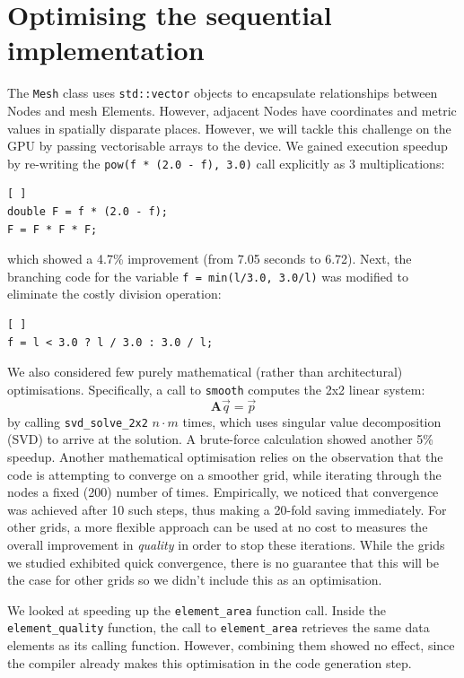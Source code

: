 \documentclass[a4paper,11pt, twocolumn]{article}
\begin{document}
\section{Optimising the sequential implementation}
The \verb+Mesh+ class uses \verb+std::vector+ objects to encapsulate relationships between Nodes and mesh Elements.
However, adjacent Nodes have coordinates and metric values in spatially disparate places.
However, we will tackle this challenge on the GPU by passing vectorisable arrays to the device.
We gained execution speedup by re-writing the \verb+pow(f * (2.0 - f), 3.0)+ call explicitly as 3 multiplications:
\begin{lstlisting}[ ]
double F = f * (2.0 - f);
F = F * F * F;
\end{lstlisting}
which showed a 4.7\% improvement (from 7.05 seconds to 6.72).
Next, the branching code for the variable \verb+f = min(l/3.0, 3.0/l)+ was modified to eliminate the costly division operation:
\begin{lstlisting}[ ]
f = l < 3.0 ? l / 3.0 : 3.0 / l;
\end{lstlisting}
We also considered few purely mathematical (rather than architectural) optimisations.
Specifically, a call to \verb+smooth+ computes the 2x2 linear system:
\[
\mathbf{A}\vec{q} = \vec{p}
\]
by calling \verb+svd_solve_2x2+ $n \cdot m$ times, which uses singular value decomposition (SVD) to arrive at the solution.
A brute-force calculation showed another 5\% speedup.
Another mathematical optimisation relies on the observation that the code is attempting to converge on a smoother grid, while iterating through the nodes a fixed (200) number of times.
Empirically, we noticed that convergence was achieved after 10 such steps, thus making a 20-fold saving immediately.
For other grids, a more flexible approach can be used at no cost to measures the overall improvement in \emph{quality} in order to stop these iterations.
While the grids we studied exhibited quick convergence, there is no guarantee that this will be the case for other grids so we didn't include this as an optimisation.

We looked at speeding up the \verb+element_area+ function call.
Inside the \verb+element_quality+ function, the call to \verb+element_area+ retrieves the same data elements as its calling function.
However, combining them showed no effect, since the compiler already makes this optimisation in the code generation step.
\end{document}
